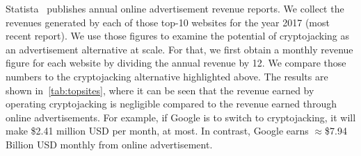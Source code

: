 \documentclass[acmlarge]{acmart}
\newcommand{\vs}[1]{{\vspace{-#1mm}}}
\newcommand{\cj}{cryptojacking\xspace}
\begin{document}
\begin{table}
\centering
\caption{Estimated monthly earnings of top websites in our dataset. Visits are in millions, average time duration of each visit is in mm-ss and Profit P-CJ is in USD.}
\label{tab:cjprofit}
\vs{0}
\end{table}


\vs{0}


Statista~\cite{Statista-17} publishes annual online advertisement revenue reports. We collect the revenues generated by each of those top-10 websites for the year 2017 (most recent report). We use those figures to examine the potential of \cj as an advertisement alternative at scale. For that, we first obtain a monthly revenue figure for each website by dividing the annual revenue by 12. We compare those numbers to the \cj alternative highlighted above. The results are shown in~\autoref{tab:topsites}, where it can be seen that the revenue earned by operating \cj is negligible compared to the revenue earned through online advertisements. For example, if Google is to switch to \cj, it will make \$2.41 million USD per month, at most. In contrast, Google earns $\approx$\$7.94 Billion USD monthly from online advertisement.
\end{document}
